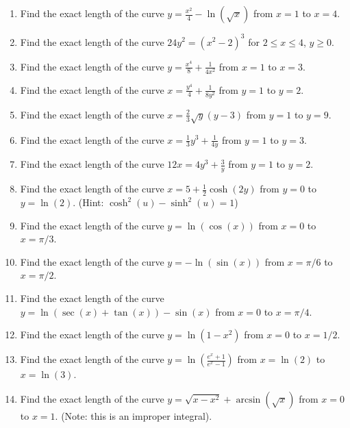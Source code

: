 \documentclass{article}
\begin{document}
\begin{enumerate}
    \item Find the exact length of the curve $y = \frac{x^2}{4} - \ln(\sqrt{x})$ from $x=1$ to $x=4$.
    
    \item Find the exact length of the curve $24y^2 = (x^2-2)^3$ for $2 \le x \le 4$, $y \ge 0$.
    
    \item Find the exact length of the curve $y = \frac{x^4}{8} + \frac{1}{4x^2}$ from $x=1$ to $x=3$.
    
    \item Find the exact length of the curve $x = \frac{y^4}{4} + \frac{1}{8y^2}$ from $y=1$ to $y=2$.
    
    \item Find the exact length of the curve $x = \frac{2}{3}\sqrt{y}(y-3)$ from $y=1$ to $y=9$.
    
    \item Find the exact length of the curve $x = \frac{1}{3}y^3 + \frac{1}{4y}$ from $y=1$ to $y=3$.
    
    \item Find the exact length of the curve $12x = 4y^3 + \frac{3}{y}$ from $y=1$ to $y=2$.
    
    \item Find the exact length of the curve $x=5+\frac{1}{2}\cosh(2y)$ from $y=0$ to $y=\ln(2)$. (Hint: $\cosh^2(u) - \sinh^2(u)=1$)
    
    \item Find the exact length of the curve $y = \ln(\cos(x))$ from $x=0$ to $x=\pi/3$.
    
    \item Find the exact length of the curve $y = -\ln(\sin(x))$ from $x=\pi/6$ to $x=\pi/2$.
    
    \item Find the exact length of the curve $y = \ln(\sec(x) + \tan(x)) - \sin(x)$ from $x=0$ to $x=\pi/4$.
    
    \item Find the exact length of the curve $y = \ln(1-x^2)$ from $x=0$ to $x=1/2$.
    
    \item Find the exact length of the curve $y = \ln(\frac{e^x+1}{e^x-1})$ from $x=\ln(2)$ to $x=\ln(3)$.
    
    \item Find the exact length of the curve $y = \sqrt{x-x^2} + \arcsin(\sqrt{x})$ from $x=0$ to $x=1$. (Note: this is an improper integral).
    

\end{enumerate}
\end{document}
